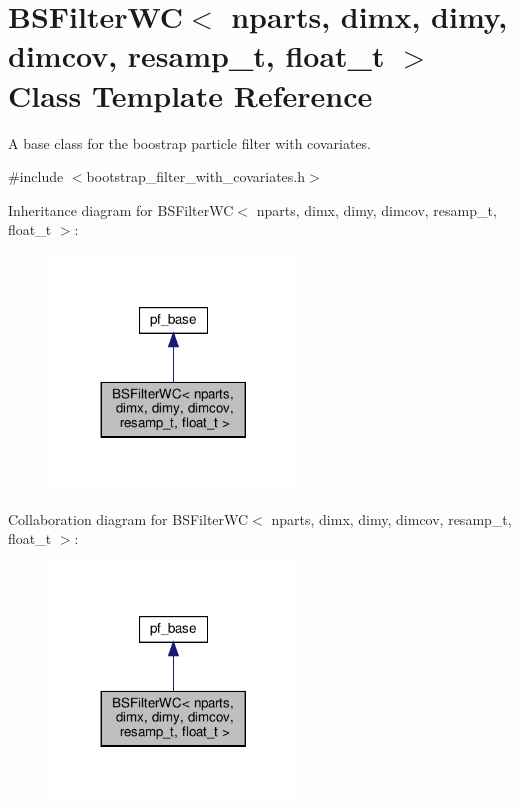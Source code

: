 \hypertarget{classBSFilterWC}{}\section{B\+S\+Filter\+WC$<$ nparts, dimx, dimy, dimcov, resamp\+\_\+t, float\+\_\+t $>$ Class Template Reference}
\label{classBSFilterWC}


A base class for the boostrap particle filter with covariates.  




{\ttfamily \#include $<$bootstrap\+\_\+filter\+\_\+with\+\_\+covariates.\+h$>$}



Inheritance diagram for B\+S\+Filter\+WC$<$ nparts, dimx, dimy, dimcov, resamp\+\_\+t, float\+\_\+t $>$\+:
\nopagebreak
\begin{figure}[H]
\begin{center}
\leavevmode
\includegraphics[width=188pt]{classBSFilterWC__inherit__graph}
\end{center}
\end{figure}


Collaboration diagram for B\+S\+Filter\+WC$<$ nparts, dimx, dimy, dimcov, resamp\+\_\+t, float\+\_\+t $>$\+:
\nopagebreak
\begin{figure}[H]
\begin{center}
\leavevmode
\includegraphics[width=188pt]{classBSFilterWC__coll__graph}
\end{center}
\end{figure}
